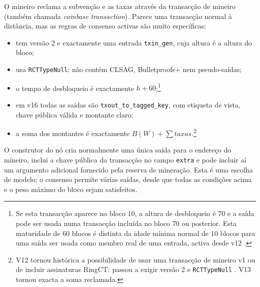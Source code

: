 %
O mineiro reclama a subvenção e as taxas através da transacção de
mineiro (também chamada {\em coinbase transaction}).
Parece uma transacção normal à distância, mas as regras de consenso activas
são muito específicas:

\begin{itemize}
\item tem versão 2 e exactamente uma entrada {\tt txin\_gen}, cuja altura é a
      altura do bloco;
\item usa {\tt RCTTypeNull}: não contém CLSAG, Bulletproofs+ nem pseudo-saídas;
\item o tempo de desbloqueio é exactamente $h+60$;\footnote{Se esta
      transacção aparece no bloco 10, a altura de desbloqueio é 70 e a saída
      pode ser usada numa transacção incluída no bloco 70 ou posterior. Esta
      maturidade de 60 blocos \cite{transaction-lock} é distinta da idade
      mínima normal de 10 blocos para uma saída ser usada como membro real de
      uma entrada, activa desde v12 \cite{monero-source-v16}.}
\item em v16 todas as saídas são {\tt txout\_to\_tagged\_key}, com etiqueta de
      vista, chave pública válida e montante claro;
\item a soma dos montantes é exactamente $B(W)+\sum\mathit{taxas}$.\footnote{V12
      tornou histórica a possibilidade de usar uma transacção de mineiro v1
      ou de incluir assinaturas RingCT: passou a exigir versão 2 e
      {\tt RCTTypeNull} \cite{miner-tx-checks}. V13 tornou exacta a soma
      reclamada.}
\end{itemize}



%
O construtor do nó cria normalmente uma única saída para o endereço do
mineiro, inclui a chave pública da transacção no campo {\tt extra} e pode
incluir aí um argumento adicional fornecido pela reserva de mineração. Esta é
uma escolha de modelo; o consenso permite várias saídas, desde que todas as
condições acima e o peso máximo do bloco sejam satisfeitos.

